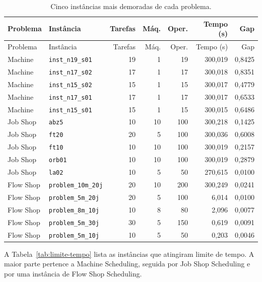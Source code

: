 \documentclass[12pt,a4paper]{article}
\begin{document}
\begin{longtable}{llrrrrr}
\caption{Cinco instâncias mais demoradas de cada problema.}
\label{tab:mais-demoradas}\\
\toprule
Problema & Instância & Tarefas & Máq. & Oper. & Tempo (s) & Gap \\
\midrule
\endfirsthead
\toprule
Problema & Instância & Tarefas & Máq. & Oper. & Tempo (s) & Gap \\
\midrule
\endhead
Machine & \texttt{inst\_n19\_s01} & 19 & 1 & 19 & 300,019 & 0,8425 \\
Machine & \texttt{inst\_n17\_s02} & 17 & 1 & 17 & 300,018 & 0,8351 \\
Machine & \texttt{inst\_n15\_s02} & 15 & 1 & 15 & 300,017 & 0,4779 \\
Machine & \texttt{inst\_n17\_s01} & 17 & 1 & 17 & 300,017 & 0,6533 \\
Machine & \texttt{inst\_n15\_s01} & 15 & 1 & 15 & 300,015 & 0,6486 \\
Job Shop & \texttt{abz5} & 10 & 10 & 100 & 300,218 & 0,1425 \\
Job Shop & \texttt{ft20} & 20 & 5 & 100 & 300,036 & 0,6008 \\
Job Shop & \texttt{ft10} & 10 & 10 & 100 & 300,019 & 0,2157 \\
Job Shop & \texttt{orb01} & 10 & 10 & 100 & 300,019 & 0,2879 \\
Job Shop & \texttt{la02} & 10 & 5 & 50 & 270,615 & 0,0100 \\
Flow Shop & \texttt{problem\_10m\_20j} & 20 & 10 & 200 & 300,249 & 0,0241 \\
Flow Shop & \texttt{problem\_5m\_20j} & 20 & 5 & 100 & 6,014 & 0,0100 \\
Flow Shop & \texttt{problem\_8m\_10j} & 10 & 8 & 80 & 2,096 & 0,0077 \\
Flow Shop & \texttt{problem\_5m\_30j} & 30 & 5 & 150 & 0,619 & 0,0091 \\
Flow Shop & \texttt{problem\_5m\_10j} & 10 & 5 & 50 & 0,203 & 0,0046 \\
\bottomrule
\end{longtable}

A Tabela~\ref{tab:limite-tempo} lista as instâncias que atingiram limite de
tempo. A maior parte pertence a Machine Scheduling, seguida por Job Shop
Scheduling e por uma instância de Flow Shop Scheduling.
\end{document}
